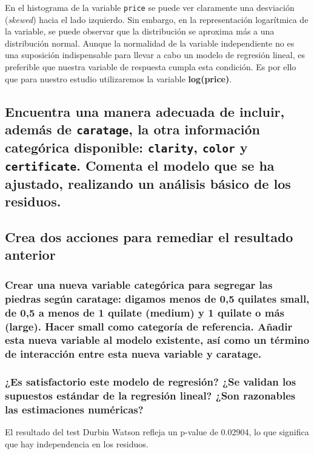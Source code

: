\documentclass[a4paper, 9pt]{article}
\begin{document}
En el histograma de la variable \texttt{price} se puede ver claramente una desviación (\textit{skewed}) hacia el lado izquierdo. Sin embargo, en la representación logarítmica de la variable, se puede observar que la distribución se aproxima más a una distribución normal. Aunque la normalidad de la variable independiente no es una suposición indispensable para llevar a cabo un modelo de regresión lineal, es preferible que nuestra variable de respuesta cumpla esta condición. Es por ello que para nuestro estudio utilizaremos la variable \textbf{log(price)}.

\subsection{Encuentra una manera adecuada de incluir, además de \texttt{caratage}, la otra información categórica disponible: \texttt{clarity}, \texttt{color} y \texttt{certificate}. Comenta el modelo que se ha ajustado, realizando un análisis básico de los residuos.}
\label{subsec:question-2}


\subsection{Crea dos acciones para remediar el resultado anterior}
\label{subsec:question-3}

\subsubsection{Crear una nueva variable categórica para segregar las piedras según caratage: digamos menos de 0,5 quilates small, de 0,5 a menos de 1 quilate (medium) y 1 quilate o más (large). Hacer small como categoría de referencia. Añadir esta nueva variable al modelo existente, así como un término de interacción entre esta nueva variable y caratage.}


\subsubsection{¿Es satisfactorio este modelo de regresión? ¿Se validan los supuestos estándar de la regresión lineal? ¿Son razonables las estimaciones numéricas?}

El resultado del test Durbin Watson refleja un p-value de 0.02904, lo que significa que hay independencia en los residuos.
\end{document}
